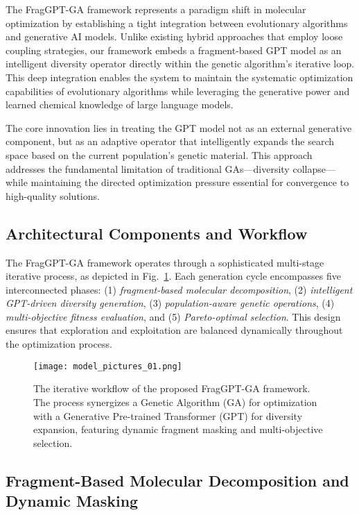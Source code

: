 \documentclass[lettersize,journal]{IEEEtran}
\begin{document}
The FragGPT-GA framework represents a paradigm shift in molecular optimization by establishing a tight integration between evolutionary algorithms and generative AI models. Unlike existing hybrid approaches that employ loose coupling strategies, our framework embeds a fragment-based GPT model as an intelligent diversity operator directly within the genetic algorithm's iterative loop. This deep integration enables the system to maintain the systematic optimization capabilities of evolutionary algorithms while leveraging the generative power and learned chemical knowledge of large language models.

The core innovation lies in treating the GPT model not as an external generative component, but as an adaptive operator that intelligently expands the search space based on the current population's genetic material. This approach addresses the fundamental limitation of traditional GAs—diversity collapse—while maintaining the directed optimization pressure essential for convergence to high-quality solutions.

\subsection{Architectural Components and Workflow}

The FragGPT-GA framework operates through a sophisticated multi-stage iterative process, as depicted in Fig.~\ref{fig:flowchart}. Each generation cycle encompasses five interconnected phases: (1) \textit{fragment-based molecular decomposition}, (2) \textit{intelligent GPT-driven diversity generation}, (3) \textit{population-aware genetic operations}, (4) \textit{multi-objective fitness evaluation}, and (5) \textit{Pareto-optimal selection}. This design ensures that exploration and exploitation are balanced dynamically throughout the optimization process.

\begin{figure}[!t]
\centering
\texttt{[image: model\_pictures\_01.png]}
\caption{The iterative workflow of the proposed FragGPT-GA framework. The process synergizes a Genetic Algorithm (GA) for optimization with a Generative Pre-trained Transformer (GPT) for diversity expansion, featuring dynamic fragment masking and multi-objective selection.}
\label{fig:flowchart}
\end{figure}

\subsection{Fragment-Based Molecular Decomposition and Dynamic Masking}
\end{document}
